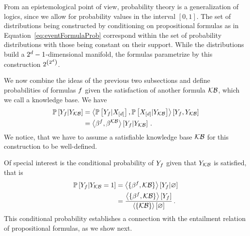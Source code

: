 From an epistemological point of view, probability theory is a generalization of logics, since we allow for probability values in the interval $[0,1]$.
The set of distributions being constructed by conditioning on propositional formulas as in Equation~\eqref{eq:eventFormulaProb} correspond within the set of probability distributions with those being constant on their support.
While the distributions build a $2^d-1$-dimensional manifold, the formulas parametrize by this construction $2^{\left(2^d\right)}$.%





We now combine the ideas of the previous two subsections and define probabilities of formulas $f$ given the satisfaction of another formula $\mathcal{KB}$, which we call a knowledge base.
We have %
\begin{align*}
    \mathbb{P}\left[Y_{f}|Y_{\mathcal{KB}}\right]
    & = \left\langle 
        \mathbb{P}\left[Y_{f}|X_{[d]}\right], \mathbb{P}\left[X_{[d]}|Y_{\mathcal{KB}}\right]
    \right\rangle \left[ Y_{f},Y_{\mathcal{KB}} \right] \\
    & = \left\langle \beta^{f},\beta^{\mathcal{KB}}\right\rangle \left[ Y_{f} | Y_{\mathcal{KB}} \right] \, .
\end{align*}
We notice, that we have to assume a satisfiable knowledge base $\mathcal{KB}$ for this construction to be well-defined.

% 
Of special interest is the conditional probability of $Y_{f}$ given that $Y_{\mathcal{KB}}$ is satisfied, that is
\begin{align*}
    \mathbb{P}\left[Y_{f}|Y_{\mathcal{KB}}=1\right]
    & = \left\langle \{\beta^{f} ,\mathcal{KB}\}\right\rangle \left[ Y_{f} | \varnothing \right]\\
    & = \frac{\left\langle \{\beta^{f},\mathcal{KB}\}\right\rangle \left[ Y_{f} \right]}{\left\langle \{\mathcal{KB}\}\right\rangle \left[ \varnothing \right]} \, .
\end{align*}
This conditional probability establishes a connection with the entailment relation of propositional formulas, as we show next.

